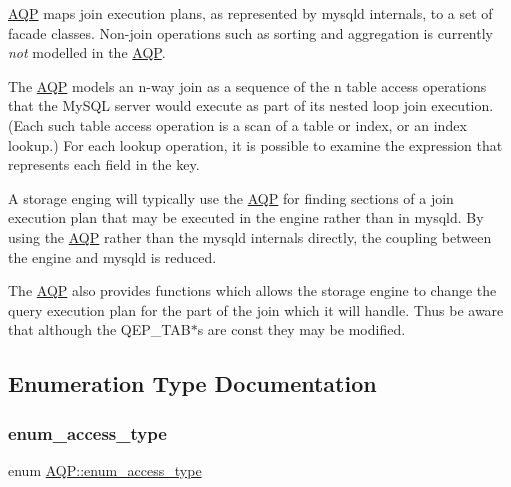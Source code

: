 \mbox{\hyperlink{namespaceAQP}{A\+QP}} maps join execution plans, as represented by mysqld internals, to a set of facade classes. Non-\/join operations such as sorting and aggregation is currently {\itshape not} modelled in the \mbox{\hyperlink{namespaceAQP}{A\+QP}}.

The \mbox{\hyperlink{namespaceAQP}{A\+QP}} models an n-\/way join as a sequence of the n table access operations that the My\+S\+QL server would execute as part of its nested loop join execution. (Each such table access operation is a scan of a table or index, or an index lookup.) For each lookup operation, it is possible to examine the expression that represents each field in the key.

A storage enging will typically use the \mbox{\hyperlink{namespaceAQP}{A\+QP}} for finding sections of a join execution plan that may be executed in the engine rather than in mysqld. By using the \mbox{\hyperlink{namespaceAQP}{A\+QP}} rather than the mysqld internals directly, the coupling between the engine and mysqld is reduced.

The \mbox{\hyperlink{namespaceAQP}{A\+QP}} also provides functions which allows the storage engine to change the query execution plan for the part of the join which it will handle. Thus be aware that although the Q\+E\+P\+\_\+\+T\+A\+B$\ast$\textquotesingle{}s are const they may be modified. 

\subsection{Enumeration Type Documentation}
\mbox{\label{namespaceAQP_a4aaae4a1dc295a865368c9822d4dd0a5}} 
\subsubsection{\texorpdfstring{enum\+\_\+access\+\_\+type}{enum\_access\_type}}
{\footnotesize\ttfamily enum \mbox{\hyperlink{namespaceAQP_a4aaae4a1dc295a865368c9822d4dd0a5}{A\+Q\+P\+::enum\+\_\+access\+\_\+type}}}

